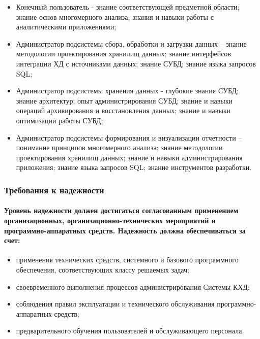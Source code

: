 \documentclass{article}
\begin{document}
             \begin{itemize}
                \item Конечный пользователь - знание соответствующей предметной области; знание основ многомерного анализа; знания и навыки работы с аналитическими приложениями;
                \item Администратор подсистемы сбора, обработки и загрузки данных – знание методологии проектирования хранилищ данных; знание интерфейсов интеграции ХД с источниками данных; знание СУБД; знание языка запросов SQL;
                \item Администратор подсистемы хранения данных - глубокие знания СУБД; знание архитектур; опыт администрирования СУБД; знание и навыки операций архивирования и восстановления данных; знание и навыки оптимизации работы СУБД;
                \item Администратор подсистемы формирования и визуализации отчетности – понимание принципов многомерного анализа; знание методологии проектирования хранилищ данных; знание и навыки администрирования приложения; знание языка запросов SQL; знание инструментов разработки.
            \end{itemize}
        
        \subsubsection{Требования к надежности}
            \paragraph{Уровень надежности должен достигаться согласованным применением организационных, организационно-технических мероприятий и программно-аппаратных средств. Надежность должна обеспечиваться за счет:}
            \begin{itemize}
                \item применения технических средств, системного и базового программного обеспечения, соответствующих классу решаемых задач;
                \item своевременного выполнения процессов администрирования Системы КХД;
                \item соблюдения правил эксплуатации и технического обслуживания программно-аппаратных средств;
                \item предварительного обучения пользователей и обслуживающего персонала.
            \end{itemize}
            
\end{document}

